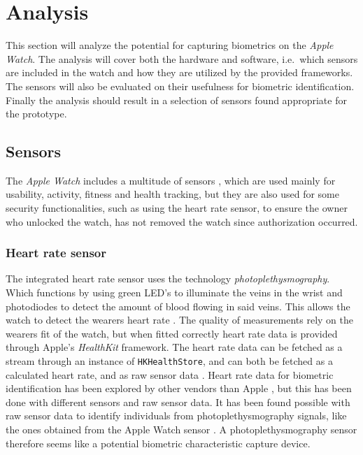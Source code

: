 \section{Analysis}
This section will analyze the potential for capturing biometrics on the
\textit{Apple Watch}. The analysis will cover both the hardware and
software, i.e.\ which sensors are included in the watch and how they are 
utilized by the provided frameworks. The sensors will also be evaluated 
on their usefulness for biometric identification. Finally the analysis 
should result in a selection of sensors found appropriate for the prototype.

\subsection{Sensors}
The \textit{Apple Watch} includes a multitude of sensors \cite{watchspecs}, 
which are used mainly for usability, activity, fitness and health tracking, but
they are also used for some security functionalities, such as using the heart 
rate sensor, to ensure the owner who unlocked the watch, has not removed the 
watch since authorization occurred.

\subsubsection{Heart rate sensor}
The integrated heart rate sensor uses the technology
\textit{photoplethysmography}. Which functions by using green LED's to
illuminate the veins in the wrist and photodiodes to detect the amount of blood
flowing in said veins. This allows the watch to detect the wearers heart rate
\cite{watchheartrate}.
The quality of measurements rely on the wearers fit of the watch, but when
fitted correctly heart rate data is provided through Apple's \textit{HealthKit}
framework. The heart rate data can be fetched as a stream through an instance of
\texttt{HKHealthStore}, and can both be fetched as a calculated heart rate, and
as raw sensor data \cite{healthkitfw}.
Heart rate data for biometric identification has been explored by other vendors
than Apple \cite{nymiwhitepaper}, but this has been done with different sensors
and raw sensor data. It has been found possible with raw sensor data to identify
individuals from photoplethysmography signals, like the ones obtained from the
Apple Watch sensor \cite{kavsaoglu2013a}. A photoplethysmography sensor
therefore seems like a potential biometric characteristic capture device.


